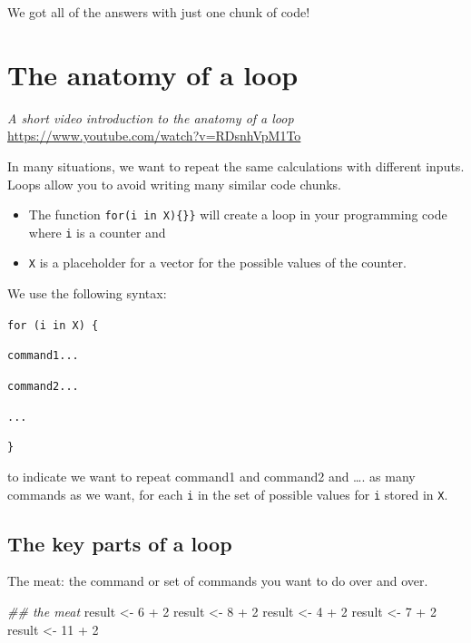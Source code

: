 \documentclass[
  letterpaper,
  DIV=11,
  numbers=noendperiod]{scrreprt}
\newenvironment{Shaded}{\begin{snugshade}}{\end{snugshade}}
\newcommand{\DecValTok}[1]{\textcolor[rgb]{0.68,0.00,0.00}{#1}}
\newcommand{\DocumentationTok}[1]{\textcolor[rgb]{0.37,0.37,0.37}{\textit{#1}}}
\newcommand{\NormalTok}[1]{\textcolor[rgb]{0.00,0.23,0.31}{#1}}
\newcommand{\OtherTok}[1]{\textcolor[rgb]{0.00,0.23,0.31}{#1}}
\newcommand{\SpecialCharTok}[1]{\textcolor[rgb]{0.37,0.37,0.37}{#1}}
\providecommand{\tightlist}{%
  \setlength{\itemsep}{0pt}\setlength{\parskip}{0pt}}\usepackage{longtable,booktabs,array}
\begin{document}
We got all of the answers with just one chunk of code!

\hypertarget{the-anatomy-of-a-loop}{%
\section{The anatomy of a loop}\label{the-anatomy-of-a-loop}}

\emph{A short video introduction to the anatomy of a loop}
\url{https://www.youtube.com/watch?v=RDsnhVpM1To}

In many situations, we want to repeat the same calculations with
different inputs. Loops allow you to avoid writing many similar code
chunks.

\begin{itemize}
\tightlist
\item
  The function \texttt{for(i\ in\ X)\{\}\}} will create a loop in your
  programming code where \texttt{i} is a counter and
\item
  \texttt{X} is a placeholder for a vector for the possible values of
  the counter.
\end{itemize}

We use the following syntax:

\texttt{for\ (i\ in\ X)\ \{}

\texttt{command1...}

\texttt{command2...}

\texttt{...}

\texttt{\}}

to indicate we want to repeat command1 and command2 and \ldots. as many
commands as we want, for each \texttt{i} in the set of possible values
for \texttt{i} stored in \texttt{X}.

\hypertarget{the-key-parts-of-a-loop}{%
\subsection{The key parts of a loop}\label{the-key-parts-of-a-loop}}

The meat: the command or set of commands you want to do over and over.

\begin{Shaded}
\begin{Highlighting}[]
\DocumentationTok{\#\# the meat}
\NormalTok{result }\OtherTok{\textless{}{-}} \DecValTok{6} \SpecialCharTok{+} \DecValTok{2}
\NormalTok{result }\OtherTok{\textless{}{-}} \DecValTok{8} \SpecialCharTok{+} \DecValTok{2}
\NormalTok{result }\OtherTok{\textless{}{-}} \DecValTok{4} \SpecialCharTok{+} \DecValTok{2}
\NormalTok{result }\OtherTok{\textless{}{-}} \DecValTok{7} \SpecialCharTok{+} \DecValTok{2}
\NormalTok{result }\OtherTok{\textless{}{-}} \DecValTok{11} \SpecialCharTok{+} \DecValTok{2}
\end{Highlighting}
\end{Shaded}
\end{document}

